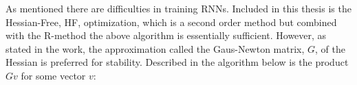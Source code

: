 As mentioned there are difficulties in training RNNs. Included in this thesis is the Hessian-Free, HF, optimization, which is a second order method but combined with the R-method the above algorithm is essentially sufficient. However, as stated in the work, the approximation called the Gaus-Newton matrix, \(G\), of the Hessian is preferred for stability. Described in the algorithm below is the product \(Gv\) for some vector $v$:

\begin{algorithmic}[1]
    \EndFor
    \State {}
\end{algorithmic}